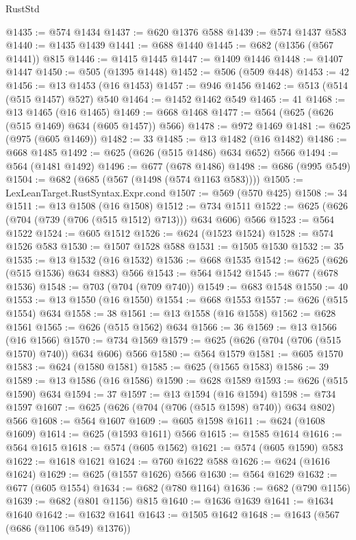 \begin{lexlean}{RustStd}
\begin{coremodule}
{\begin{coremodule}
{{{{{{{{{{{{{{{@1435 := @574 @1434
@1437 := @620 @1376 @588
@1439 := @574 @1437 @583
@1440 := @1435 @1439
@1441 := @688 @1440
@1445 := @682 (@1356 (@567 @1441)) @815
@1446 := @1415 @1445
@1447 := @1409 @1446
@1448 := @1407 @1447
@1450 := @505 (@1395 @1448)
@1452 := @506 (@509 @448)
@1453 := 42
@1456 := @13 @1453 (@16 @1453)
@1457 := @946 @1456
@1462 := @513 (@514 (@515 @1457) @527) @540
@1464 := @1452 @1462 @549
@1465 := 41
@1468 := @13 @1465 (@16 @1465)
@1469 := @668 @1468
@1477 := @564 (@625 (@626 (@515 @1469) @634 (@605 @1457)) @566)
@1478 := @972 @1469
@1481 := @625 (@975 (@605 @1469))
@1482 := 33
@1485 := @13 @1482 (@16 @1482)
@1486 := @668 @1485
@1492 := @625 (@626 (@515 @1486) @634 @652) @566
@1494 := @564 (@1481 @1492)
@1496 := @677 (@678 @1486)
@1498 := @686 (@995 @549)
@1504 := @682 (@685 (@567 (@1498 (@574 @1163 @583))))
@1505 := LexLeanTarget.RustSyntax.Expr.cond
@1507 := @569 (@570 @425)
@1508 := 34
@1511 := @13 @1508 (@16 @1508)
@1512 := @734 @1511
@1522 := @625 (@626 (@704 (@739 (@706 (@515 @1512) @713))) @634 @606) @566
@1523 := @564 @1522
@1524 := @605 @1512
@1526 := @624 (@1523 @1524)
@1528 := @574 @1526 @583
@1530 := @1507 @1528 @588
@1531 := @1505 @1530
@1532 := 35
@1535 := @13 @1532 (@16 @1532)
@1536 := @668 @1535
@1542 := @625 (@626 (@515 @1536) @634 @883) @566
@1543 := @564 @1542
@1545 := @677 (@678 @1536)
@1548 := @703 (@704 (@709 @740))
@1549 := @683 @1548
@1550 := 40
@1553 := @13 @1550 (@16 @1550)
@1554 := @668 @1553
@1557 := @626 (@515 @1554) @634
@1558 := 38
@1561 := @13 @1558 (@16 @1558)
@1562 := @628 @1561
@1565 := @626 (@515 @1562) @634
@1566 := 36
@1569 := @13 @1566 (@16 @1566)
@1570 := @734 @1569
@1579 := @625 (@626 (@704 (@706 (@515 @1570) @740)) @634 @606) @566
@1580 := @564 @1579
@1581 := @605 @1570
@1583 := @624 (@1580 @1581)
@1585 := @625 (@1565 @1583)
@1586 := 39
@1589 := @13 @1586 (@16 @1586)
@1590 := @628 @1589
@1593 := @626 (@515 @1590) @634
@1594 := 37
@1597 := @13 @1594 (@16 @1594)
@1598 := @734 @1597
@1607 := @625 (@626 (@704 (@706 (@515 @1598) @740)) @634 @802) @566
@1608 := @564 @1607
@1609 := @605 @1598
@1611 := @624 (@1608 @1609)
@1614 := @625 (@1593 @1611) @566
@1615 := @1585 @1614
@1616 := @564 @1615
@1618 := @574 (@605 @1562)
@1621 := @574 (@605 @1590) @583
@1622 := @1618 @1621
@1624 := @760 @1622 @588
@1626 := @624 (@1616 @1624)
@1629 := @625 (@1557 @1626) @566
@1630 := @564 @1629
@1632 := @677 (@605 @1554)
@1634 := @682 (@780 @1164)
@1636 := @682 (@790 @1156)
@1639 := @682 (@801 @1156) @815
@1640 := @1636 @1639
@1641 := @1634 @1640
@1642 := @1632 @1641
@1643 := @1505 @1642
@1648 := @1643 (@567 (@686 (@1106 @549) @1376))
}}}}}}}}}}}}}}}
\end{coremodule}}
\end{coremodule}
\end{lexlean}
